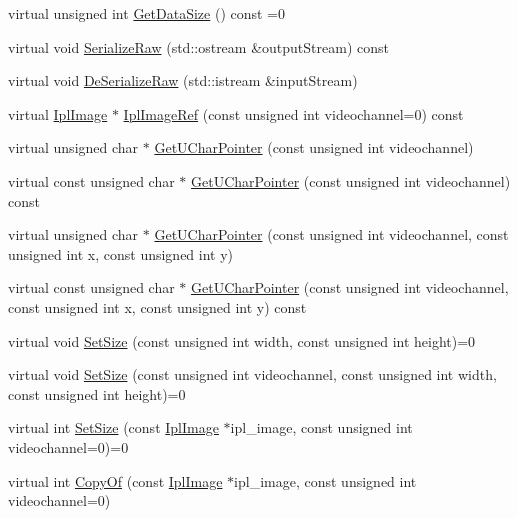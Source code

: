\begin{DoxyCompactItemize}
\item 
virtual unsigned int \hyperlink{classsvl_sample_c_u_d_a_image_afff8663e603047c1c6362daefebf7e47}{Get\-Data\-Size} () const =0
\item 
virtual void \hyperlink{classsvl_sample_c_u_d_a_image_afa06e96bb83e21adb533a602221432dc}{Serialize\-Raw} (std\-::ostream \&output\-Stream) const 
\item 
virtual void \hyperlink{classsvl_sample_c_u_d_a_image_ab09d7cf8b648321c6906335998897797}{De\-Serialize\-Raw} (std\-::istream \&input\-Stream)
\item 
virtual \hyperlink{svl_types_8h_aa5a40a13021ba9708bfe921e18fdfa53}{Ipl\-Image} $\ast$ \hyperlink{classsvl_sample_c_u_d_a_image_a42cdc8530cd24b6cbe7215545360145c}{Ipl\-Image\-Ref} (const unsigned int videochannel=0) const 
\item 
virtual unsigned char $\ast$ \hyperlink{classsvl_sample_c_u_d_a_image_a6fa54c02d9ef41e88354dfb687d18c82}{Get\-U\-Char\-Pointer} (const unsigned int videochannel)
\item 
virtual const unsigned char $\ast$ \hyperlink{classsvl_sample_c_u_d_a_image_a07ff219ee1c51e675ccc08b0cbb86adb}{Get\-U\-Char\-Pointer} (const unsigned int videochannel) const 
\item 
virtual unsigned char $\ast$ \hyperlink{classsvl_sample_c_u_d_a_image_af56adc449e7a74bd2b8ed3be9062d757}{Get\-U\-Char\-Pointer} (const unsigned int videochannel, const unsigned int x, const unsigned int y)
\item 
virtual const unsigned char $\ast$ \hyperlink{classsvl_sample_c_u_d_a_image_a32198e02963a9aec2785c6ca76d7176d}{Get\-U\-Char\-Pointer} (const unsigned int videochannel, const unsigned int x, const unsigned int y) const 
\item 
virtual void \hyperlink{classsvl_sample_c_u_d_a_image_a8e8d4b761c82afb7cf4e08852fb9c5a5}{Set\-Size} (const unsigned int width, const unsigned int height)=0
\item 
virtual void \hyperlink{classsvl_sample_c_u_d_a_image_a692d4b96e25e3ace46f84606cffab219}{Set\-Size} (const unsigned int videochannel, const unsigned int width, const unsigned int height)=0
\item 
virtual int \hyperlink{classsvl_sample_c_u_d_a_image_a1d5c01d23b191bf16c370dd67fef6d7e}{Set\-Size} (const \hyperlink{svl_types_8h_aa5a40a13021ba9708bfe921e18fdfa53}{Ipl\-Image} $\ast$ipl\-\_\-image, const unsigned int videochannel=0)=0
\item 
virtual int \hyperlink{classsvl_sample_c_u_d_a_image_a5036280241a192db6f80feb6ca456922}{Copy\-Of} (const \hyperlink{svl_types_8h_aa5a40a13021ba9708bfe921e18fdfa53}{Ipl\-Image} $\ast$ipl\-\_\-image, const unsigned int videochannel=0)

\end{DoxyCompactItemize}

